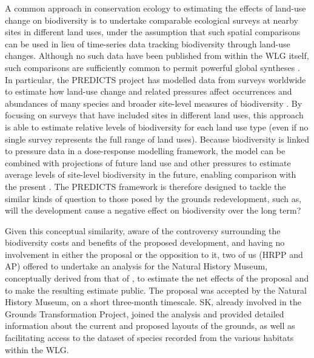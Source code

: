 A common approach in conservation ecology to estimating the effects of land-use change on biodiversity is to undertake comparable ecological surveys at nearby sites in different land uses, under the assumption that such spatial comparisons can be used in lieu of time-series data tracking biodiversity through land-use changes. Although no such data have been published from within the WLG itself, such comparisons are sufficiently common to permit powerful global syntheses \citep[e.g.][]{Alkemade:2009globio3,Gibson:2011fk,Gerstner:2014jae}. In particular, the PREDICTS project has modelled data from surveys worldwide to estimate how land-use change and related pressures affect occurrences and abundances of many species \citep{Newbold:2014procb,DePalma:2015jae} and broader site-level measures of biodiversity \citep{Newbold:2015nat,Newbold:2016sci,DePalma:2016scirep}. By focusing on surveys that have included sites in different land uses, this approach is able to estimate relative levels of biodiversity for each land use type (even if no single survey represents the full range of land uses). Because biodiversity is linked to pressure data in a dose-response modelling framework, the model can be combined with projections of future land use and other pressures to estimate average levels of site-level biodiversity in the future, enabling comparison with the present \citep{Newbold:2015nat}. The PREDICTS framework is therefore designed to tackle the similar kinds of question to those posed by the grounds redevelopment, such as, will the development cause a negative effect on biodiversity over the long term?

Given this conceptual similarity, aware of the controversy surrounding the biodiversity costs and benefits of the proposed development, and having no involvement in either the proposal or the opposition to it, two of us (HRPP and AP) offered to undertake an analysis for the Natural History Museum, conceptually derived from that of \cite{Newbold:2015nat}, to estimate the net effects of the proposal and to make the resulting estimate public. The proposal was accepted by the Natural History Museum, on a short three-month timescale. SK, already involved in the Grounds Transformation Project, joined the analysis and provided detailed information about the current and proposed layouts of the grounds, as well as facilitating access to the dataset of species recorded from the various habitats within the WLG.

